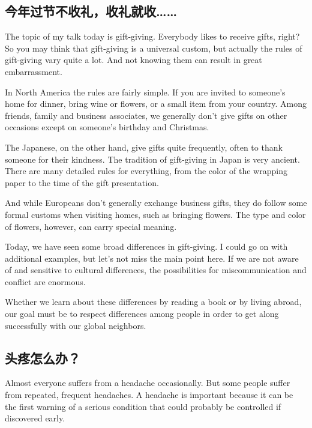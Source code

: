 \subsection{今年过节不收礼，收礼就收……}
\begin{margintable}\vspace{-2cm}\footnotesize
\end{margintable}
The topic of my talk today is gift-giving. Everybody likes to
receive gifts, right? So you may think that gift-giving is a
universal custom, but actually the rules of gift-giving vary
quite a lot. And not knowing them can result in great embarrassment.

In North America the rules are fairly simple. If you are invited
to someone's home for dinner, bring wine or flowers,
or a small item from your country. Among friends, family
and business associates, we generally don't give gifts
on other occasions except on someone's birthday and
Christmas.

The Japanese, on the other hand, give gifts quite frequently,
often to thank someone for their kindness. The tradition
of gift-giving in Japan is very ancient. There are many
detailed rules for everything, from the color of the wrapping
paper to the time of the gift presentation.

And while Europeans don't generally exchange business
gifts, they do follow some formal customs when visiting
homes, such as bringing flowers. The type and color of
flowers, however, can carry special meaning.

Today, we have seen some broad differences in gift-giving.
I could go on with additional examples, but let's not
miss the main point here. If we are not aware of and
sensitive to cultural differences, the possibilities for miscommunication
and conflict are enormous.

Whether we learn about these differences by reading a
book or by living abroad, our goal must be to respect differences
among people in order to get along successfully
with our global neighbors.

\subsection{头疼怎么办？}
\begin{margintable}\vspace{-2cm}\footnotesize
\end{margintable}
Almost everyone suffers from a headache occasionally.
But some people suffer from repeated, frequent headaches.
A headache is important because it can be
the first warning of a serious condition that could probably
be controlled if discovered early.

